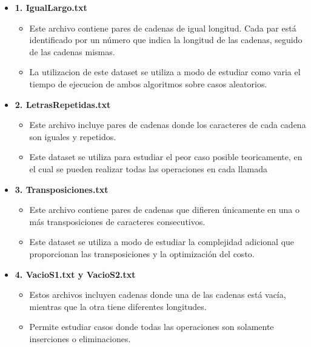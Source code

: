 \begin{itemize}
    \item \textbf{1. IgualLargo.txt}
    \begin{itemize}
        \item Este archivo contiene pares de cadenas de igual longitud. Cada par está identificado por un número que indica la longitud de las cadenas, seguido de las cadenas mismas. 
        \item La utilizacion de este dataset se utiliza a modo de estudiar como varia el tiempo de ejecucion de ambos algoritmos sobre casos aleatorios.
    \end{itemize}
    \item \textbf{2. LetrasRepetidas.txt}
    \begin{itemize}
        \item Este archivo incluye pares de cadenas donde los caracteres de cada cadena son iguales y repetidos.
        \item Este dataset se utiliza para estudiar el peor caso posible teoricamente, en el cual se pueden realizar todas las operaciones en cada llamada
    \end{itemize}
    \item \textbf{3. Transposiciones.txt}
    \begin{itemize}
        \item Este archivo contiene pares de cadenas que difieren únicamente en una o más transposiciones de caracteres consecutivos.
        \item Este dataset se utiliza a modo de estudiar la complejidad adicional que proporcionan las transposiciones y la optimización del costo.
    \end{itemize}
    \item \textbf{4. VacioS1.txt y VacioS2.txt}
    \begin{itemize}
        \item Estos archivos incluyen cadenas donde una de las cadenas está vacía, mientras que la otra tiene diferentes longitudes.
        \item Permite estudiar casos donde todas las operaciones son solamente inserciones o eliminaciones.
    \end{itemize}
\end{itemize}